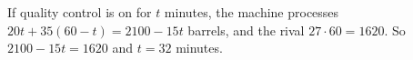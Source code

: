 If quality control is on for $t$ minutes, the machine processes $20t+35(60-t)=2100-15t$ barrels, and the rival $27\cdot60=1620$. So $2100-15t=1620$ and $t=\boxed{32}$ minutes.
